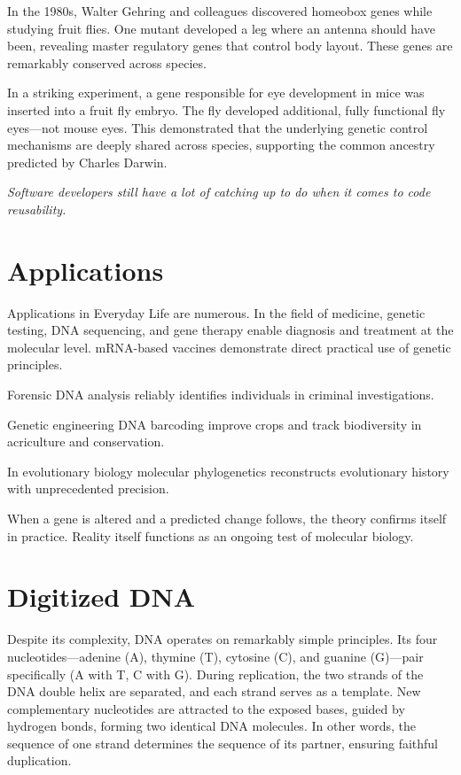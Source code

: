 In the 1980s, Walter Gehring and colleagues discovered homeobox genes while studying fruit flies. 
One mutant developed a leg where an antenna should have been, revealing master regulatory genes that control body layout. 
These genes are remarkably conserved across species.

In a striking experiment, a gene responsible for eye development in mice was inserted into a fruit fly embryo. 
The fly developed additional, fully functional fly eyes—not mouse eyes. 
This demonstrated that the underlying genetic control mechanisms are deeply shared across species, supporting the common ancestry predicted by Charles Darwin.

\textit{Software developers still have a lot of catching up to do when it comes to code reusability.}


\section*{Applications}

Applications in Everyday Life are numerous. In the field of medicine, genetic testing, DNA sequencing, and gene therapy enable diagnosis and treatment at the molecular level. 
mRNA-based vaccines demonstrate direct practical use of genetic principles.

Forensic DNA analysis reliably identifies individuals in criminal investigations.

Genetic engineering DNA barcoding improve crops and track biodiversity in acriculture and conservation.

In evolutionary biology molecular phylogenetics reconstructs evolutionary history with unprecedented precision.

When a gene is altered and a predicted change follows, the theory confirms itself in practice. Reality itself functions as an ongoing test of molecular biology.


\section*{Digitized DNA}

Despite its complexity, DNA operates on remarkably simple principles. Its four nucleotides—adenine (A), thymine (T), cytosine (C), and guanine (G)—pair specifically (A with T, C with G). 
During replication, the two strands of the DNA double helix are separated, and each strand serves as a template. 
New complementary nucleotides are attracted to the exposed bases, guided by hydrogen bonds, forming two identical DNA molecules. 
In other words, the sequence of one strand determines the sequence of its partner, ensuring faithful duplication.

